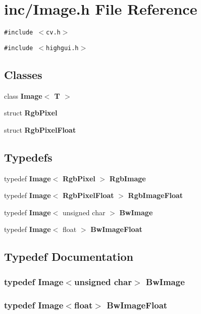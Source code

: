 \section{inc/Image.h File Reference}
\label{Image_8h}
{\tt \#include $<$cv.h$>$}\par
{\tt \#include $<$highgui.h$>$}\par
\subsection*{Classes}
\begin{CompactItemize}
\item 
class {\bf Image$<$ T $>$}
\item 
struct {\bf RgbPixel}
\item 
struct {\bf RgbPixelFloat}
\end{CompactItemize}
\subsection*{Typedefs}
\begin{CompactItemize}
\item 
typedef {\bf Image}$<$ {\bf RgbPixel} $>$ {\bf RgbImage}
\item 
typedef {\bf Image}$<$ {\bf RgbPixelFloat} $>$ {\bf RgbImageFloat}
\item 
typedef {\bf Image}$<$ unsigned char $>$ {\bf BwImage}
\item 
typedef {\bf Image}$<$ float $>$ {\bf BwImageFloat}
\end{CompactItemize}


\subsection{Typedef Documentation}
\subsubsection{\setlength{\rightskip}{0pt plus 5cm}typedef {\bf Image}$<$unsigned char$>$ {\bf BwImage}}\label{Image_8h_ecd86f1c33e5a3f76422c0ab9f9e38c3}


\subsubsection{\setlength{\rightskip}{0pt plus 5cm}typedef {\bf Image}$<$float$>$ {\bf BwImageFloat}}\label{Image_8h_2130f585f4404af8694b42030f09baec}



